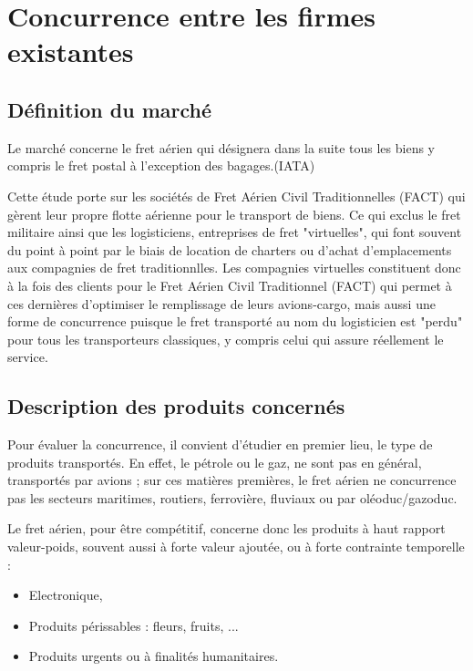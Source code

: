 
\section{Concurrence entre les firmes existantes}

\subsection{Définition du marché}

Le marché concerne le fret aérien qui désignera dans la suite tous les biens y compris le fret postal à l’exception des bagages.(IATA)

Cette étude porte sur les sociétés de Fret Aérien Civil Traditionnelles (FACT) qui gèrent leur propre flotte aérienne pour le transport de biens. Ce qui exclus le fret militaire ainsi que les logisticiens, entreprises de fret "virtuelles", qui font souvent du point à point par le biais de location de charters ou d'achat d'emplacements aux compagnies de fret traditionnlles. Les compagnies virtuelles constituent donc à la fois des clients pour le Fret Aérien Civil Traditionnel (FACT) qui permet à ces dernières d'optimiser le remplissage de leurs avions-cargo, mais aussi une forme de concurrence puisque le fret transporté au nom du logisticien est "perdu" pour tous les transporteurs classiques, y compris celui qui assure réellement le service. 



\subsection{Description des produits concernés}
Pour évaluer la concurrence, il convient d'étudier en premier lieu, le type de produits transportés. En effet, le pétrole ou le gaz, ne sont pas en général, transportés par avions ; sur ces matières premières, le fret aérien ne concurrence pas les secteurs maritimes, routiers, ferrovière, fluviaux ou par oléoduc/gazoduc. 

Le fret aérien, pour être compétitif, concerne donc les produits à haut rapport valeur-poids, souvent aussi à forte valeur ajoutée, ou à forte contrainte temporelle :


\begin{itemize}
	\item Electronique,
	\item Produits périssables : fleurs, fruits, ...
	\item Produits urgents ou à finalités humanitaires.
\end{itemize}



